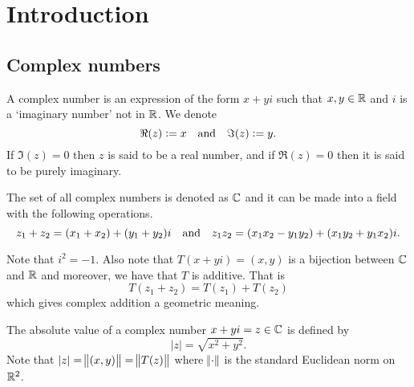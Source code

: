 \documentclass[11pt,a4paper]{article}
\begin{document}
\maketitle


\newpage
\tableofcontents
\newpage

\section{Introduction}

\subsection{Complex numbers}

\begin{definition}
    A complex number is an expression of the form $x + yi$ such that
    $x,y \in \mathbb{R}$ and $i$ is a `imaginary number' not in $\mathbb{R}$.
    We denote
    \[
        \Re(z) := x \quad \text{and} \quad \Im(z) := y.
    \]
    If $\Im(z) = 0$ then $z$ is said to be a real number, and if
    $\Re(z) = 0$ then it is said to be purely imaginary.
\end{definition}

The set of all complex numbers is denoted as $\mathbb{C}$ and it can be made into
a field with the following operations.
\[
    z_1 + z_2 = (x_1 + x_2) + (y_1 + y_2) i \quad \text{and} \quad
    z_1 z_2 = (x_1 x_2 - y_1 y_2) + (x_1 y_2 + y_1 x_2) i.
\]

Note that $i^2 = -1$.
Also note that $T(x + y i) = (x, y)$ is a bijection between $\mathbb{C}$ and $\mathbb{R}$ and
moreover, we have that $T$ is additive.
That is
\[
    T(z_1 + z_2) = T(z_1) + T(z_2)
\]
which gives complex addition a geometric meaning.

\begin{center}
\end{center}

The absolute value of a complex number $x + y i = z \in \mathbb{C}$ is defined by
\[
    |z| = \sqrt{x^2 + y^2}.
\]
Note that $|z| = \norm{(x,y)}= \norm{T(z)}$ where $\norm{\cdot}$ is the standard
Euclidean norm on $\mathbb{R}^2$.
\end{document}

